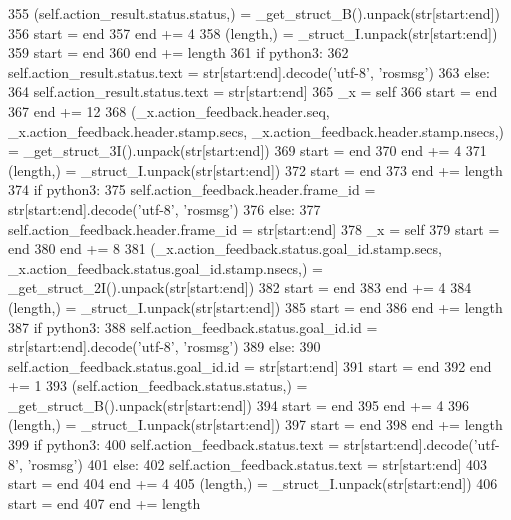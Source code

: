 \begin{DoxyCode}
355       (self.action\_result.status.status,) = \_get\_struct\_B().unpack(str[start:end])
356       start = end
357       end += 4
358       (length,) = \_struct\_I.unpack(str[start:end])
359       start = end
360       end += length
361       \textcolor{keywordflow}{if} python3:
362         self.action\_result.status.text = str[start:end].decode(\textcolor{stringliteral}{'utf-8'}, \textcolor{stringliteral}{'rosmsg'})
363       \textcolor{keywordflow}{else}:
364         self.action\_result.status.text = str[start:end]
365       \_x = self
366       start = end
367       end += 12
368       (\_x.action\_feedback.header.seq, \_x.action\_feedback.header.stamp.secs, 
      \_x.action\_feedback.header.stamp.nsecs,) = \_get\_struct\_3I().unpack(str[start:end])
369       start = end
370       end += 4
371       (length,) = \_struct\_I.unpack(str[start:end])
372       start = end
373       end += length
374       \textcolor{keywordflow}{if} python3:
375         self.action\_feedback.header.frame\_id = str[start:end].decode(\textcolor{stringliteral}{'utf-8'}, \textcolor{stringliteral}{'rosmsg'})
376       \textcolor{keywordflow}{else}:
377         self.action\_feedback.header.frame\_id = str[start:end]
378       \_x = self
379       start = end
380       end += 8
381       (\_x.action\_feedback.status.goal\_id.stamp.secs, \_x.action\_feedback.status.goal\_id.stamp.nsecs,) = 
      \_get\_struct\_2I().unpack(str[start:end])
382       start = end
383       end += 4
384       (length,) = \_struct\_I.unpack(str[start:end])
385       start = end
386       end += length
387       \textcolor{keywordflow}{if} python3:
388         self.action\_feedback.status.goal\_id.id = str[start:end].decode(\textcolor{stringliteral}{'utf-8'}, \textcolor{stringliteral}{'rosmsg'})
389       \textcolor{keywordflow}{else}:
390         self.action\_feedback.status.goal\_id.id = str[start:end]
391       start = end
392       end += 1
393       (self.action\_feedback.status.status,) = \_get\_struct\_B().unpack(str[start:end])
394       start = end
395       end += 4
396       (length,) = \_struct\_I.unpack(str[start:end])
397       start = end
398       end += length
399       \textcolor{keywordflow}{if} python3:
400         self.action\_feedback.status.text = str[start:end].decode(\textcolor{stringliteral}{'utf-8'}, \textcolor{stringliteral}{'rosmsg'})
401       \textcolor{keywordflow}{else}:
402         self.action\_feedback.status.text = str[start:end]
403       start = end
404       end += 4
405       (length,) = \_struct\_I.unpack(str[start:end])
406       start = end
407       end += length

\end{DoxyCode}
